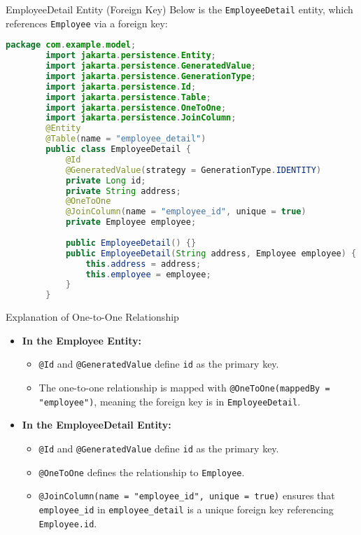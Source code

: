 \documentclass[aspectratio=169, table]{beamer}
\begin{document}
\begin{frame}[fragile]{EmployeeDetail Entity (Foreign Key)}
	\vspace{30pt}
	Below is the \texttt{EmployeeDetail} entity, which references \texttt{Employee} via a foreign key:
	
	\begin{lstlisting}[language=Java, style=JavaStyle]
		package com.example.model;
		import jakarta.persistence.Entity;
		import jakarta.persistence.GeneratedValue;
		import jakarta.persistence.GenerationType;
		import jakarta.persistence.Id;
		import jakarta.persistence.Table;
		import jakarta.persistence.OneToOne;
		import jakarta.persistence.JoinColumn;
		@Entity
		@Table(name = "employee_detail")
		public class EmployeeDetail {
			@Id
			@GeneratedValue(strategy = GenerationType.IDENTITY)
			private Long id;
			private String address;
			@OneToOne
			@JoinColumn(name = "employee_id", unique = true)
			private Employee employee;
			
			public EmployeeDetail() {}
			public EmployeeDetail(String address, Employee employee) {
				this.address = address;
				this.employee = employee;
			}
		}
	\end{lstlisting}
\end{frame}

\begin{frame}{Explanation of One-to-One Relationship}
	\vspace{20pt}
	\begin{itemize}
		\item \textbf{In the Employee Entity:}
		\begin{itemize}
			\item \texttt{@Id} and \texttt{@GeneratedValue} define \texttt{id} as the primary key.
			\item The one-to-one relationship is mapped with \texttt{@OneToOne(mappedBy = "employee")}, meaning the foreign key is in \texttt{EmployeeDetail}.
		\end{itemize}
		\item \textbf{In the EmployeeDetail Entity:}
		\begin{itemize}
			\item \texttt{@Id} and \texttt{@GeneratedValue} define \texttt{id} as the primary key.
			\item \texttt{@OneToOne} defines the relationship to \texttt{Employee}.
			\item \texttt{@JoinColumn(name = "employee\_id", unique = true)} ensures that \texttt{employee\_id} in \texttt{employee\_detail} is a unique foreign key referencing \texttt{Employee.id}.
		\end{itemize}
	\end{itemize}
\end{frame}
\end{document}
